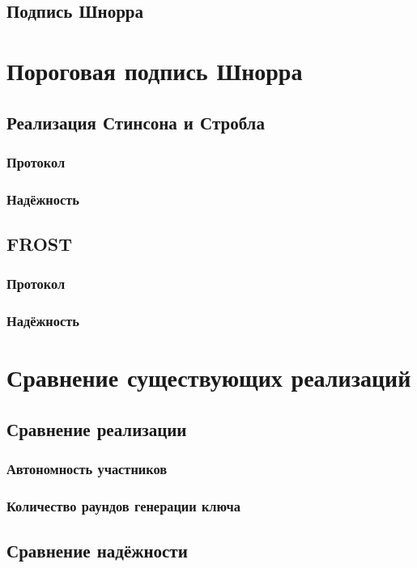 \begin{enumerate}
\end{enumerate}


\section{Подпись Шнорра}
\chapter{Пороговая подпись Шнорра}
\section{Реализация Стинсона и Стробла}
\subsection{Протокол}
\subsection{Надёжность}
\section{FROST}
\subsection{Протокол}
\subsection{Надёжность}
\chapter{Сравнение существующих реализаций}
\section{Сравнение реализации}
\subsection{Автономность участников}
\subsection{Количество раундов генерации ключа}
\section{Сравнение надёжности}